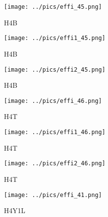 \documentclass[10pt, xcolor={dvipsnames}, aspectratio = 169]{beamer}
\begin{document}
\begin{frame}

\begin{figure}
\centering
\texttt{[image: ../pics/effi\_45.png]}
\caption{H4B}
\end{figure}

\end{frame}


\begin{frame}

\begin{figure}
\centering
\texttt{[image: ../pics/effi1\_45.png]}
\caption{H4B}
\end{figure}

\end{frame}


\begin{frame}

\begin{figure}
\centering
\texttt{[image: ../pics/effi2\_45.png]}
\caption{H4B}
\end{figure}

\end{frame}

\begin{frame}

\begin{figure}
\centering
\texttt{[image: ../pics/effi\_46.png]}
\caption{H4T}
\end{figure}

\end{frame}


\begin{frame}

\begin{figure}
\centering
\texttt{[image: ../pics/effi1\_46.png]}
\caption{H4T}
\end{figure}

\end{frame}


\begin{frame}

\begin{figure}
\centering
\texttt{[image: ../pics/effi2\_46.png]}
\caption{H4T}
\end{figure}

\end{frame}

\begin{frame}

\begin{figure}
\centering
\texttt{[image: ../pics/effi\_41.png]}
\caption{H4Y1L}
\end{figure}

\end{frame}
\end{document}
